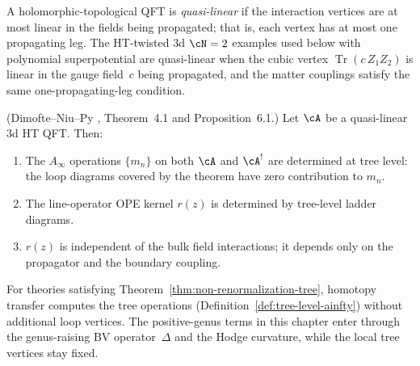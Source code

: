 \begin{definition}
\label{def:quasi-linear}
A holomorphic-topological QFT is \emph{quasi-linear} if the
interaction vertices are at most linear in the fields being
propagated; that is, each vertex has at most one propagating leg.
The HT-twisted $3$d $\cN=2$ examples used below with polynomial
superpotential are quasi-linear when the cubic vertex
$\operatorname{Tr}(c\,Z_1 Z_2)$ is linear in the gauge field~$c$
being propagated, and the matter couplings satisfy the same
one-propagating-leg condition.
\end{definition}

\begin{theorem}
\label{thm:non-renormalization-tree}
\textup{(Dimofte--Niu--Py \cite{DNP2025}, Theorem~4.1 and
Proposition~6.1.)}
Let $\cA$ be a quasi-linear $3$d HT QFT. Then:
\begin{enumerate}
\item[\textup{(i)}] The $A_\infty$ operations $\{m_n\}$ on both
 $\cA$ and $\cA^!$ are determined at tree level: the loop diagrams
 covered by the theorem have zero contribution to $m_n$.
\item[\textup{(ii)}] The line-operator OPE kernel $r(z)$ is
 determined by tree-level ladder diagrams.
\item[\textup{(iii)}] $r(z)$ is independent of the bulk field
 interactions; it depends only on the propagator and the
 boundary coupling.
\end{enumerate}
\end{theorem}

\begin{remark}
\label{rem:non-renorm-validation}
For theories satisfying Theorem~\ref{thm:non-renormalization-tree},
homotopy transfer computes the tree operations
(Definition~\ref{def:tree-level-ainfty}) without additional loop
vertices.  The positive-genus terms in this chapter enter through the
genus-raising BV operator~$\Delta$ and the Hodge curvature, while the
local tree vertices stay fixed.
\end{remark}

